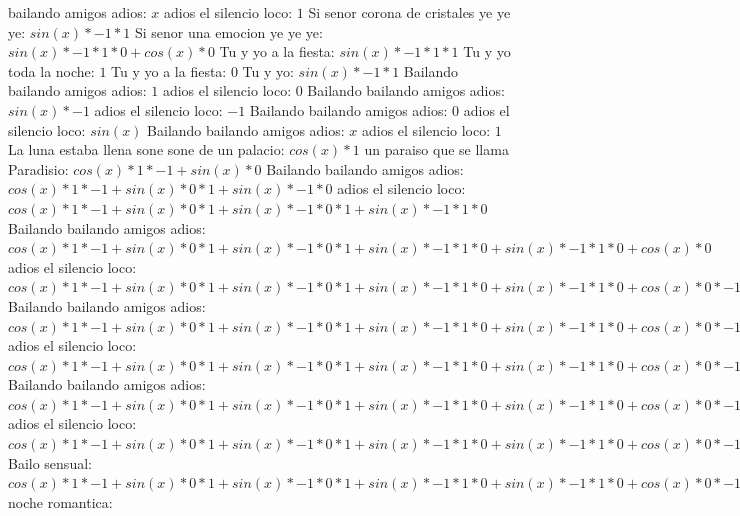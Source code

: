 \documentclass{article}
\begin{document}
bailando amigos adios: $x$ adios el silencio loco: $1$  \newline Si senor corona de cristales ye ye ye: $sin(x)*-1*1$ Si senor una emocion ye ye ye: $sin(x)*-1*1*0+cos(x)*0$ Tu y yo a la fiesta: $sin(x)*-1*1*1$ Tu y yo toda la noche: $1$ Tu y yo a la fiesta: $0$  \newline Tu y yo: $sin(x)*-1*1$ Bailando bailando amigos adios: $1$ adios el silencio loco: $0$  \newline Bailando bailando amigos adios: $sin(x)*-1$ adios el silencio loco: $-1$ Bailando bailando amigos adios: $0$  \newline adios el silencio loco: $sin(x)$  \newline Bailando bailando amigos adios: $x$ adios el silencio loco: $1$  \newline La luna estaba llena sone sone de un palacio: $cos(x)*1$ un paraiso que se llama Paradisio: $cos(x)*1*-1+sin(x)*0$ Bailando bailando amigos adios: ${cos(x)*1*-1+sin(x)*0}*1+sin(x)*-1*0$ adios el silencio loco: ${{cos(x)*1*-1+sin(x)*0}*1+sin(x)*-1*0}*1+sin(x)*-1*1*0$ Bailando bailando amigos adios: ${{cos(x)*1*-1+sin(x)*0}*1+sin(x)*-1*0}*1+sin(x)*-1*1*0+sin(x)*-1*1*0+cos(x)*0$ adios el silencio loco: ${{{cos(x)*1*-1+sin(x)*0}*1+sin(x)*-1*0}*1+sin(x)*-1*1*0+sin(x)*-1*1*0+cos(x)*0}*-1+{sin(x)*-1*1*1+cos(x)*0}*0$ Bailando bailando amigos adios: ${{{cos(x)*1*-1+sin(x)*0}*1+sin(x)*-1*0}*1+sin(x)*-1*1*0+sin(x)*-1*1*0+cos(x)*0}*-1+{sin(x)*-1*1*1+cos(x)*0}*0+{sin(x)*-1*1*1+cos(x)*0}*0+cos(x)*1*0$ adios el silencio loco: ${{{cos(x)*1*-1+sin(x)*0}*1+sin(x)*-1*0}*1+sin(x)*-1*1*0+sin(x)*-1*1*0+cos(x)*0}*-1+{sin(x)*-1*1*1+cos(x)*0}*0+{sin(x)*-1*1*1+cos(x)*0}*0+cos(x)*1*0+{sin(x)*-1*1*1+cos(x)*0}*0+cos(x)*1*0+cos(x)*1*0+sin(x)*0$ Bailando bailando amigos adios: ${{{{cos(x)*1*-1+sin(x)*0}*1+sin(x)*-1*0}*1+sin(x)*-1*1*0+sin(x)*-1*1*0+cos(x)*0}*-1+{sin(x)*-1*1*1+cos(x)*0}*0+{sin(x)*-1*1*1+cos(x)*0}*0+cos(x)*1*0+{sin(x)*-1*1*1+cos(x)*0}*0+cos(x)*1*0+cos(x)*1*0+sin(x)*0}*0+{{sin(x)*-1*1*1+cos(x)*0}*-1+cos(x)*1*0+cos(x)*1*0+sin(x)*0}*0$ adios el silencio loco: ${{{{cos(x)*1*-1+sin(x)*0}*1+sin(x)*-1*0}*1+sin(x)*-1*1*0+sin(x)*-1*1*0+cos(x)*0}*-1+{sin(x)*-1*1*1+cos(x)*0}*0+{sin(x)*-1*1*1+cos(x)*0}*0+cos(x)*1*0+{sin(x)*-1*1*1+cos(x)*0}*0+cos(x)*1*0+cos(x)*1*0+sin(x)*0}*0+{{sin(x)*-1*1*1+cos(x)*0}*-1+cos(x)*1*0+cos(x)*1*0+sin(x)*0}*0+{{sin(x)*-1*1*1+cos(x)*0}*-1+cos(x)*1*0+cos(x)*1*0+sin(x)*0}*0+{cos(x)*1*-1+sin(x)*0}*0$ Bailo sensual: ${{{{cos(x)*1*-1+sin(x)*0}*1+sin(x)*-1*0}*1+sin(x)*-1*1*0+sin(x)*-1*1*0+cos(x)*0}*-1+{sin(x)*-1*1*1+cos(x)*0}*0+{sin(x)*-1*1*1+cos(x)*0}*0+cos(x)*1*0+{sin(x)*-1*1*1+cos(x)*0}*0+cos(x)*1*0+cos(x)*1*0+sin(x)*0}*0+{{sin(x)*-1*1*1+cos(x)*0}*-1+cos(x)*1*0+cos(x)*1*0+sin(x)*0}*0+{{sin(x)*-1*1*1+cos(x)*0}*-1+cos(x)*1*0+cos(x)*1*0+sin(x)*0}*0+{cos(x)*1*-1+sin(x)*0}*0+{{sin(x)*-1*1*1+cos(x)*0}*-1+cos(x)*1*0+cos(x)*1*0+sin(x)*0}*0+{cos(x)*1*-1+sin(x)*0}*0+{cos(x)*1*-1+sin(x)*0}*0+sin(x)*-1*0$ noche romantica: 
\end{document}

